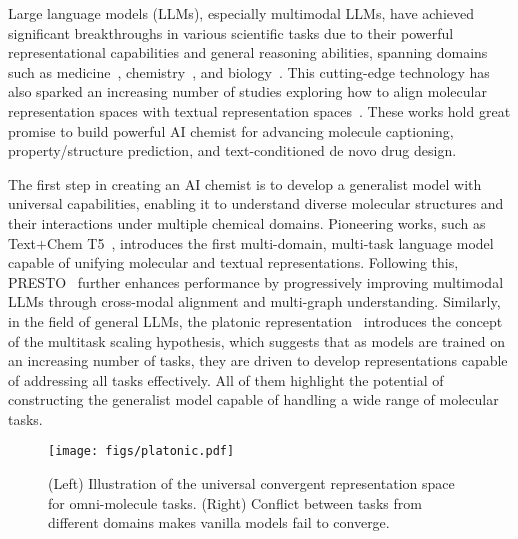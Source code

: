 Large language models (LLMs), especially multimodal LLMs, have achieved significant breakthroughs in various scientific tasks due to their powerful representational capabilities and general reasoning abilities, spanning domains such as medicine~\cite{jee2024automated,zhou2024pre}, chemistry~\cite{boiko2023autonomous}, and biology~\cite{zhang2024multimodal}.
This cutting-edge technology has also sparked an increasing number of studies exploring how to align molecular representation spaces with textual representation spaces~\cite{cao2023instructmol,chen2024hight,fang2024molinstructions,cao-etal-2024-presto}. These works hold great promise to build powerful AI chemist for advancing molecule captioning, property/structure prediction, and text-conditioned de novo drug design.


The first step in creating an AI chemist is to develop a generalist model with universal capabilities, enabling it to understand diverse molecular structures and their interactions under multiple chemical domains.
Pioneering works, such as Text$+$Chem T5~\cite{christofidellis2023unifying}, introduces the first multi-domain, multi-task language model capable of unifying molecular and textual representations. Following this, PRESTO~\cite{cao-etal-2024-presto} further enhances performance by progressively improving multimodal LLMs through cross-modal alignment and multi-graph understanding. 
Similarly, in the field of general LLMs, the platonic representation~\cite{huh2024platonic} introduces the concept of the multitask scaling hypothesis, which suggests that as models are trained on an increasing number of tasks, they are driven to develop representations capable of addressing all tasks effectively. All of them highlight the potential of constructing the generalist model capable of handling a wide range of molecular tasks.

\begin{figure}
    \centering
    \texttt{[image: figs/platonic.pdf]}
    \vspace{-0.3cm}
    \caption{\small (Left) Illustration of the universal convergent representation space for omni-molecule tasks. (Right) Conflict between tasks from different domains makes vanilla models fail to converge.}
    \vspace{-0.5cm}
    \label{fig:platonic conv}
\end{figure}

